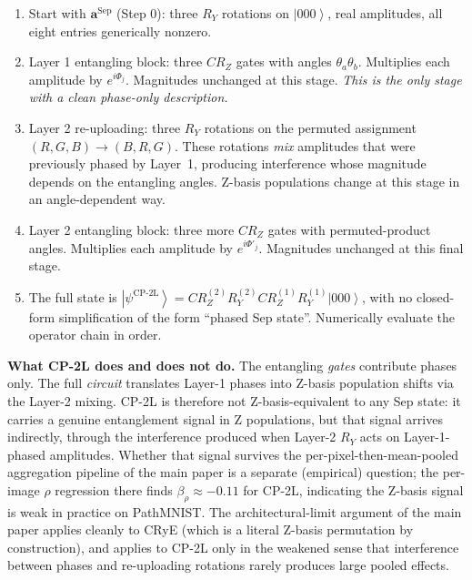 \documentclass[11pt]{article}
\newcommand{\ket}[1]{\left| #1 \right\rangle}
\begin{document}
\begin{enumerate}
\item Start with $\mathbf a^\text{Sep}$ (Step 0): three $R_Y$ rotations on $\ket{000}$, real amplitudes, all eight entries generically nonzero.
\item Layer 1 entangling block: three $CR_Z$ gates with angles $\theta_a \theta_b$. Multiplies each amplitude by $e^{i\Phi_j}$. Magnitudes unchanged at this stage. \emph{This is the only stage with a clean phase-only description.}
\item Layer 2 re-uploading: three $R_Y$ rotations on the permuted assignment $(R, G, B) \to (B, R, G)$. These rotations \emph{mix} amplitudes that were previously phased by Layer~1, producing interference whose magnitude depends on the entangling angles. Z-basis populations change at this stage in an angle-dependent way.
\item Layer 2 entangling block: three more $CR_Z$ gates with permuted-product angles. Multiplies each amplitude by $e^{i\Phi'_j}$. Magnitudes unchanged at this final stage.
\item The full state is $\ket{\psi^\text{CP-2L}} = CR_Z^{(2)} R_Y^{(2)} CR_Z^{(1)} R_Y^{(1)} \ket{000}$, with no closed-form simplification of the form ``phased Sep state''. Numerically evaluate the operator chain in order.
\end{enumerate}

\noindent\textbf{What CP-2L does and does not do.} The entangling \emph{gates} contribute phases only. The full \emph{circuit} translates Layer-1 phases into Z-basis population shifts via the Layer-2 mixing. CP-2L is therefore not Z-basis-equivalent to any Sep state: it carries a genuine entanglement signal in Z populations, but that signal arrives indirectly, through the interference produced when Layer-2 $R_Y$ acts on Layer-1-phased amplitudes. Whether that signal survives the per-pixel-then-mean-pooled aggregation pipeline of the main paper is a separate (empirical) question; the per-image $\rho$ regression there finds $\beta_\rho \approx -0.11$ for CP-2L, indicating the Z-basis signal is weak in practice on PathMNIST. The architectural-limit argument of the main paper applies cleanly to CRyE (which is a literal Z-basis permutation by construction), and applies to CP-2L only in the weakened sense that interference between phases and re-uploading rotations rarely produces large pooled effects.
\end{document}
